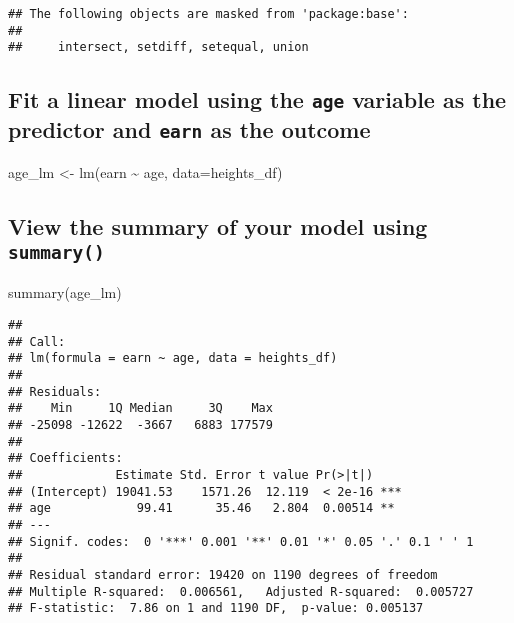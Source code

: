 \documentclass[
]{article}
\newenvironment{Shaded}{\begin{snugshade}}{\end{snugshade}}
\newcommand{\AttributeTok}[1]{\textcolor[rgb]{0.77,0.63,0.00}{#1}}
\newcommand{\FunctionTok}[1]{\textcolor[rgb]{0.00,0.00,0.00}{#1}}
\newcommand{\NormalTok}[1]{#1}
\newcommand{\OtherTok}[1]{\textcolor[rgb]{0.56,0.35,0.01}{#1}}
\newcommand{\SpecialCharTok}[1]{\textcolor[rgb]{0.00,0.00,0.00}{#1}}
\begin{document}
\begin{verbatim}
## The following objects are masked from 'package:base':
## 
##     intersect, setdiff, setequal, union
\end{verbatim}

\hypertarget{fit-a-linear-model-using-the-age-variable-as-the-predictor-and-earn-as-the-outcome}{%
\subsection{\texorpdfstring{Fit a linear model using the \texttt{age}
variable as the predictor and \texttt{earn} as the
outcome}{Fit a linear model using the age variable as the predictor and earn as the outcome}}\label{fit-a-linear-model-using-the-age-variable-as-the-predictor-and-earn-as-the-outcome}}

\begin{Shaded}
\begin{Highlighting}[]
\NormalTok{age\_lm }\OtherTok{\textless{}{-}} \FunctionTok{lm}\NormalTok{(earn }\SpecialCharTok{\textasciitilde{}}\NormalTok{ age, }\AttributeTok{data=}\NormalTok{heights\_df)}
\end{Highlighting}
\end{Shaded}

\hypertarget{view-the-summary-of-your-model-using-summary}{%
\subsection{\texorpdfstring{View the summary of your model using
\texttt{summary()}}{View the summary of your model using summary()}}\label{view-the-summary-of-your-model-using-summary}}

\begin{Shaded}
\begin{Highlighting}[]
\FunctionTok{summary}\NormalTok{(age\_lm)}
\end{Highlighting}
\end{Shaded}

\begin{verbatim}
## 
## Call:
## lm(formula = earn ~ age, data = heights_df)
## 
## Residuals:
##    Min     1Q Median     3Q    Max 
## -25098 -12622  -3667   6883 177579 
## 
## Coefficients:
##             Estimate Std. Error t value Pr(>|t|)    
## (Intercept) 19041.53    1571.26  12.119  < 2e-16 ***
## age            99.41      35.46   2.804  0.00514 ** 
## ---
## Signif. codes:  0 '***' 0.001 '**' 0.01 '*' 0.05 '.' 0.1 ' ' 1
## 
## Residual standard error: 19420 on 1190 degrees of freedom
## Multiple R-squared:  0.006561,   Adjusted R-squared:  0.005727 
## F-statistic:  7.86 on 1 and 1190 DF,  p-value: 0.005137
\end{verbatim}
\end{document}
